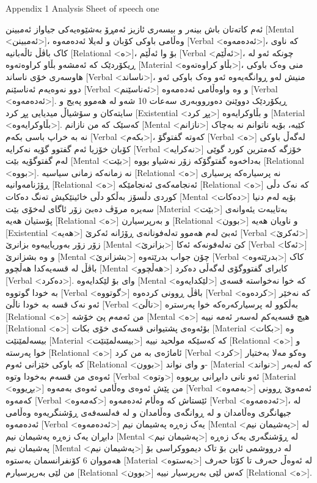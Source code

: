 Appendix 1
Analysis Sheet of speech one

ئەم کاتەتان باش بینەر و بیسەری ئازیز ئەمڕۆ بەشێوەیەکی جیاواز ئەمبینن [Mental <ئەمبینن>]، وەڵامی باوکی کۆبان و لەیلا ئەدەمەوە [Verbal <ئەدەمەوە>]، کە ناوی کاک باڤڵ تاڵەبانیە [Relational <ە>]، بۆ وا ئەڵێم [Verbal <ئەڵێم>]، چونکە ئەو لە ڕیکۆردێک کە ئەمشەو بڵاو کراوەتەوە [Material <بڵاو کراوەتەوە>]، منی وەک باوکی هاوسەری خۆی ناساند [Verbal <ناساند>]، منیش لەو ڕوانگەیەوە ئەو وەک باوکی ئەو دوو نەوەیەم ئەناسێنم [Verbal <ئەناسێنم>] و وە واوەڵامی ئەدەمەوە [Verbal <ئەدەمەوە>]. ڕیکۆردێک دووێنێ دەورووبەری سەعات 10 شەو لە هەموو پەیج و سایتەکان و سۆشیاڵ میدیایی پڕ کرد [Existential <پڕ کرد>] و بڵاوکرایەوە [Material <بڵاوکرایەوە>].
کەسێک کە من نازانم [Mental <نازانم>] کێیە، بۆیە ناتوانم نە بەچاک نە بە خراپ باسی بکەم [Verbal <بکەم>]، کەوتە گفتوگۆ [Verbal <ە>] لەگەڵ باوکی کۆبان خۆزیا ئەم گفتوو گۆیە نەکرایە [Verbal <نەکرایە>] خۆزگە کەمترین کورد گوێی لەم گفتوگۆیە بێت [Mental <بێت>] بەداخەوە گفتوگۆکە زۆر نەشیاو بووە [Relational <بووە>].
نە زمانەکە زمانی سیاسیە [Relational <ە>] نە پرسیارەکه پرسیاری ڕۆژنامەوانیە [Relational <ە>] ئەنجامەکەی ئەنجامێکە [Relational <ە>] کە نەک دڵی کوردی دڵسۆز بەڵکو دڵی خائینێکیش تەنگ دەکات [Mental <دەکات>] بۆیە لەم دنیا سەیرە مرۆڤ دەبێ زۆر ئاگای لەخۆی بێت [Material <بێت>] بەتایبەت یئەوانەی پۆستیان هەیە [Relational <ە>] و بەرپرسیارن [Relational <بوون>] و ناویان هەیە [Existential <هەیە>] ئەبێ لەم هەموو تەلەفونانەی ڕۆژانە ئەکرێ [Verbal <ئەکرێ>] زۆر زۆر بەوریاییەوە بزانرێ [Mental <بزانرێ>] کێ تەلەفونەکە ئەکا [Verbal <ئەکا>] و وە بشزانرێ [Mental <بشزانرێ>] چۆن جواب بدرێتەوە [Verbal <بدرێتەوە>] کاک باڤڵ لە قسەیەکدا هەڵچوو [Mental <هەڵچوو>] کابرای گفتووگۆی لەگەڵی دەکرد [Verbal <دەکرد>].
وای بۆ لێکدایەوە [Mental <لێکدایەوە>] کە خوا نەخواستە قسەی بە خودا گوتووە [Verbal <گوتووە>] باڤڵ ڕوونی کردەوە [Verbal <کردەوە>] کە نەخێر ئەو نەک قسە بە خودا ناڵێ [Verbal <ناڵێ>] بەڵکوو لە پرسیارکەرەکه خوا پەرسترە [Relational <ە>] من ئەمەم پێ خۆشە [Mental <ە>] هیچ قسەیەکم لەسەر ئەمە نییە [Relational <ە>] بۆئەوەی پشتیوانی قسەکەی خۆی بکات [Material <بکات>] وە بیسەلمێنێت [Material <بیسەلمێنێت>] کە کەسێکە مولحید نییە [Relational <ە>] و خوا پەرستە [Relational <ە>] ئاماژەی بە من کرد [Verbal <کرد>] وەکو مەلا بەختیار کە باوکی خێزانی ئەوم [Relational <بوون>] و وای نواند- [Material <نواند>] کە لەبەر ئەوەی من قسەم بەخودا وتوە [Verbal <وتوە>] ئەو نانی دابڕانی بڕیووە [Material <بڕیووە>] من پێش ئەوەی وەڵامی ئەوەی بەمەوە [Verbal <بەمەوە>] ئەمەوێ ڕوونی کەمەوە [Verbal <کەمەوە>] ئێستاش کە وەڵام ئەدەمەوە [Verbal <ئەدەمەوە>]، لە جیهانگری وەڵامدان و لە ڕوانگەی وەڵامدان و لە فەلسەفەی ڕۆشنگریەوە وەڵامی ئەدەمەوە [Verbal <ئەدەمەوە>] یەک زەڕە پەشیمان نیم [Mental <پەشیمان نیم>] لە دابڕان یەک زەڕە پەشیمان نیم [Mental <پەشیمان نیم>] لە ڕۆشنگەری یەک زەڕە پەشیمان نیم [Mental <پەشیمان نیم>] لە درووشمی ئاین بۆ تاک دیمووکراسی بۆ هەمووان 6 کۆنفرانسمان بەستوە [Material <بەستوە>] لە ئەوەڵ حەرف تا کۆتا حەرف من لێی بەرپرسیارم [Relational <بوون>] کەس لێی بەرپرسیار نییە [Relational <ە>].
